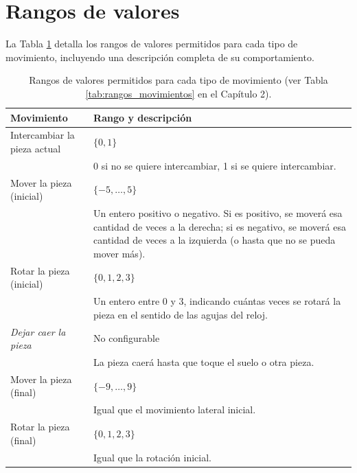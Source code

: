 \documentclass[11pt,spanish,listoffigures,listoftables]{tfgetsinf}
\begin{document}
\section{Rangos de valores}

La Tabla \ref{tab:rangos_movimientos_appendix} detalla los rangos de valores permitidos para cada tipo de movimiento, incluyendo una descripción completa de su comportamiento.

\begin{table}[H]
    \centering
    \begin{tabular}{lp{8cm}}
        \toprule
        \textbf{Movimiento} & \textbf{Rango y descripción} \\
        \midrule
        Intercambiar la pieza actual & $\{0, 1\}$ \\ 
        & 0 si no se quiere intercambiar, 1 si se quiere intercambiar. \\
        \midrule
        Mover la pieza (inicial) & $\{-5, \dots, 5\}$ \\ 
        & Un entero positivo o negativo. Si es positivo, se moverá esa cantidad de veces a la derecha; si es negativo, se moverá esa cantidad de veces a la izquierda (o hasta que no se pueda mover más). \\
        \midrule
        Rotar la pieza (inicial) & $\{0, 1, 2, 3\}$ \\ 
        & Un entero entre 0 y 3, indicando cuántas veces se rotará la pieza en el sentido de las agujas del reloj. \\
        \midrule
        \textit{Dejar caer la pieza} & No configurable \\ 
        & La pieza caerá hasta que toque el suelo o otra pieza. \\
        \midrule
        Mover la pieza (final) & $\{-9, \dots, 9\}$ \\ 
        & Igual que el movimiento lateral inicial. \\
        \midrule
        Rotar la pieza (final) & $\{0, 1, 2, 3\}$ \\ 
        & Igual que la rotación inicial. \\
        \bottomrule
    \end{tabular}
    \caption{Rangos de valores permitidos para cada tipo de movimiento (ver Tabla \ref{tab:rangos_movimientos} en el Capítulo 2).}
    \label{tab:rangos_movimientos_appendix}

\end{table}



\end{document}
